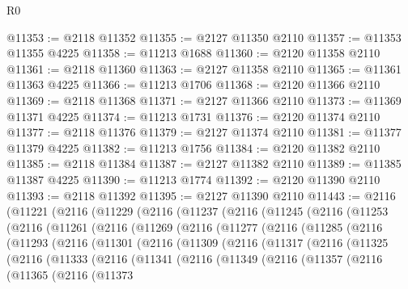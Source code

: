 \begin{lexlean}{R0}
\begin{coremodule}
@11353 := @2118 @11352
@11355 := @2127 @11350 @2110
@11357 := @11353 @11355 @4225
@11358 := @11213 @1688
@11360 := @2120 @11358 @2110
@11361 := @2118 @11360
@11363 := @2127 @11358 @2110
@11365 := @11361 @11363 @4225
@11366 := @11213 @1706
@11368 := @2120 @11366 @2110
@11369 := @2118 @11368
@11371 := @2127 @11366 @2110
@11373 := @11369 @11371 @4225
@11374 := @11213 @1731
@11376 := @2120 @11374 @2110
@11377 := @2118 @11376
@11379 := @2127 @11374 @2110
@11381 := @11377 @11379 @4225
@11382 := @11213 @1756
@11384 := @2120 @11382 @2110
@11385 := @2118 @11384
@11387 := @2127 @11382 @2110
@11389 := @11385 @11387 @4225
@11390 := @11213 @1774
@11392 := @2120 @11390 @2110
@11393 := @2118 @11392
@11395 := @2127 @11390 @2110
@11443 := @2116
    (@11221
      (@2116
        (@11229
          (@2116
            (@11237
              (@2116
                (@11245
                  (@2116
                    (@11253
                      (@2116
                        (@11261
                          (@2116
                            (@11269
                              (@2116
                                (@11277
                                  (@2116
                                    (@11285
                                      (@2116
                                        (@11293
                                          (@2116
                                            (@11301
                                              (@2116
                                                (@11309
                                                  (@2116
                                                    (@11317
                                                      (@2116
                                                        (@11325
                                                          (@2116
                                                            (@11333
                                                              (@2116
                                                                (@11341
                                                                  (@2116
                                                                    (@11349
                                                                      (@2116
                                                                        (@11357
                                                                          (@2116
                                                                            (@11365
                                                                              (@2116
                                                                                (@11373

\end{coremodule}
\end{lexlean}

